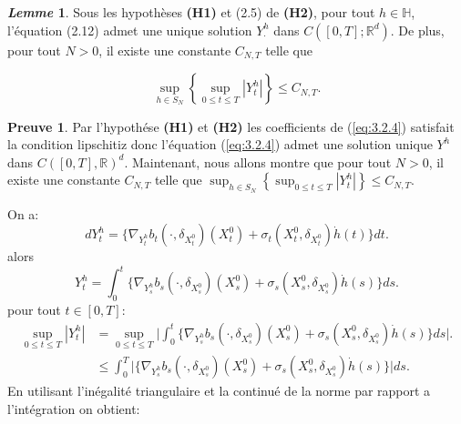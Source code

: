 \documentclass[12pt,a4paper,twoside]{report}%
\theoremstyle{definition}
\newtheorem*{pr}{\textbf{Preuve}}
\newtheorem{lem}[dfn]{\textit{Lemme}}
\numberwithin{equation}{section}
\begin{document}
	 \begin{lem}\label{lem:3.2.3}
	 	Sous les hypothèses \textbf{(H1)} et (2.5) de \textbf{(H2)}, pour tout \(h \in \mathbb{H}\), l'équation (2.12) admet une unique solution \(Y^h_\cdot\) dans \(C([0,T]; \mathbb{R}^d)\). De plus, pour tout \(N > 0\), il existe une constante \(C_{N,T}\) telle que
	 	
	 	\begin{equation}\label{eq:3.2.8}
	 		\sup_{h \in S_N} \left\{ \sup_{0 \leq t \leq T} |Y^h_t| \right\} \leq C_{N,T}.
	 	\end{equation}
	 \end{lem}
	 \begin{pr}
	 Par l'hypothése \textbf{(H1)} et \textbf{(H2)} les coefficients de (\ref{eq:3.2.4}) satisfait la condition lipschitiz donc l'équation (\ref{eq:3.2.4}) admet une solution unique $Y^h$ dans $C([0,T],\mathbb{R})^d$. Maintenant, nous allons montre que pour tout $N>0$, il existe une constante $C_{N,T}$ telle que \(\sup_{h \in S_N} \left\{ \sup_{0 \leq t \leq T} |Y^h_t| \right\} \leq C_{N,T}.\)
	 
	 On a:
	 \[
	 dY_t^h=\Bigg\{\nabla_{Y_t^h}b_t(\cdot,\delta_{X_t^0})(X_t^0) +\sigma_t(X_t^0,\delta_{X_t^0})\dot{h}(t)\Bigg\}dt.
	 \]
	 alors
	 \[
	  Y_t^h=\int_{0}^{t}\big\{\nabla_{Y_s^h}b_s(\cdot,\delta_{X_s^0})(X_s^0) +\sigma_s(X_s^0,\delta_{X_s^0})\dot{h}(s)\big\}ds.
	 \]
	 pour tout $t\in[0,T]$:
	 \[
	 \begin{aligned}
	\sup_{0 \leq t \leq T}|Y_t^h|&=\sup_{0 \leq t \leq T}\Big|\int_{0}^{t}\big\{\nabla_{Y_s^h}b_s(\cdot,\delta_{X_s^0})(X_s^0) +\sigma_s(X_s^0,\delta_{X_s^0})\dot{h}(s)\big\}ds\Big|.\\
	&\leq\int_{0}^{T}\Big|\big\{\nabla_{Y_s^h}b_s(\cdot,\delta_{X_s^0})(X_s^0) +\sigma_s(X_s^0,\delta_{X_s^0})\dot{h}(s)\big\}\Big|ds.
	\end{aligned}
	 \]	 
	 En utilisant l'inégalité triangulaire et la continué de la norme par rapport a l'intégration on obtient:
	 

\end{pr}
\end{document}
